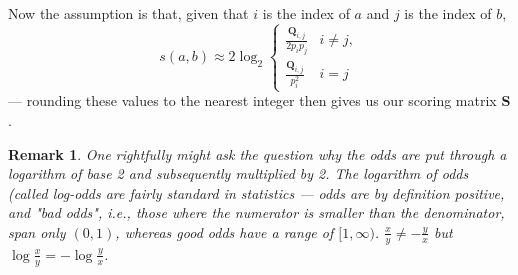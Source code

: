 \documentclass{article}
\newtheorem{remark}{Remark}
\begin{document}
\begin{multicols}{2}
Now the assumption is that, given that $i$ is the index of $a$ and $j$ is the index of $b$,
\begin{equation*}
	s(a, b) \approx	2 \log_2 \begin{cases}
		\frac{\mathbf Q_{i, j}}{2p_ip_j} & i \ne j, \\
		\frac{\mathbf Q_{i, j}}{p_i^2} & i = j
	\end{cases}
\end{equation*}
--- rounding these values to the nearest integer then gives us our scoring matrix $\mathbf S$.

\begin{remark}
	One rightfully might ask the question why the odds are put through a logarithm of base 2 and subsequently multiplied by 2. 
	The logarithm of odds (called \emph{log-odds} are fairly standard in statistics --- odds are by definition positive, and "bad odds", i.e., those where the numerator is smaller than the denominator, span only $(0, 1)$, whereas good odds have a range of $[1, \infty)$. $\frac x y \ne -\frac y x$ but $\log \frac x y = - \log \frac y x $.


\end{remark}
\end{multicols}
\end{document}
